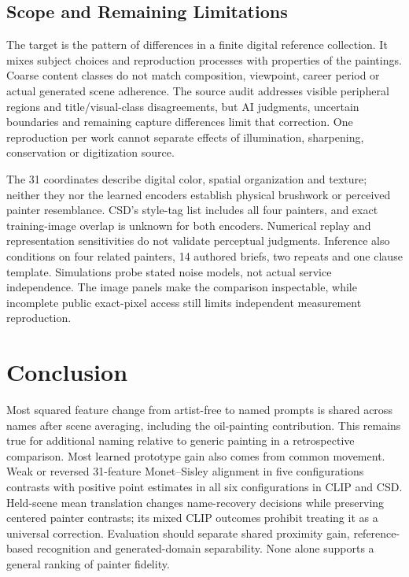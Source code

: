 \subsection{Scope and Remaining Limitations}
The target is the pattern of differences in a finite digital reference
collection. It mixes subject choices and reproduction processes with properties
of the paintings. Coarse content classes do not match composition, viewpoint,
career period or actual generated scene adherence. The source audit addresses
visible peripheral regions and title/visual-class disagreements, but AI
judgments, uncertain boundaries and remaining capture differences limit that
correction. One reproduction per work cannot separate effects of illumination,
sharpening, conservation or digitization source.

The 31 coordinates describe digital color, spatial organization and texture;
neither they nor the learned encoders establish physical brushwork or perceived
painter resemblance. CSD's style-tag list includes all four painters, and exact
training-image overlap is unknown for both encoders. Numerical replay and
representation sensitivities do not validate perceptual judgments.
Inference also conditions on four related
painters, 14 authored briefs, two repeats and one clause template. Simulations
probe stated noise models, not actual service independence. The image panels
make the comparison inspectable, while incomplete public exact-pixel access
still limits independent measurement reproduction.

\section{Conclusion}
Most squared feature change from artist-free to named prompts is shared across
names after scene averaging, including the oil-painting contribution.
This remains true for additional naming relative to generic painting in a
retrospective comparison.
Most learned prototype gain also comes from common movement. Weak or reversed
31-feature Monet--Sisley alignment in five configurations contrasts with positive
point estimates in all six configurations in CLIP and CSD.
Held-scene mean translation changes name-recovery decisions while preserving
centered painter contrasts; its mixed CLIP outcomes prohibit treating it as a
universal correction. Evaluation should separate shared proximity gain,
reference-based recognition and generated-domain separability. None alone
supports a general ranking of painter fidelity.
